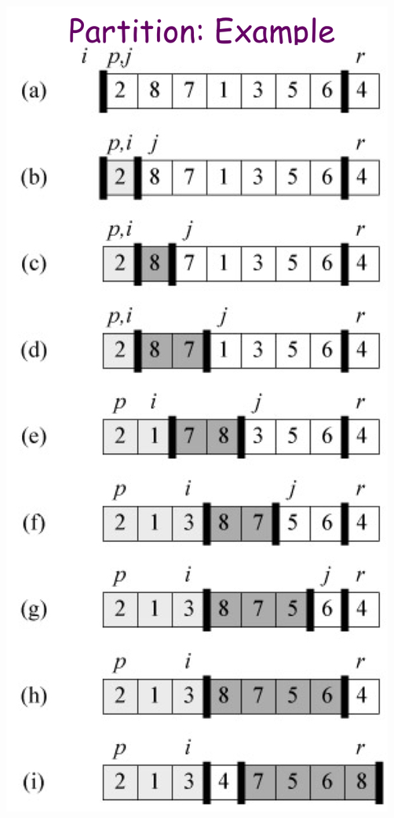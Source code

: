 \documentclass[11pt, a4paper]{COMP3711}
\begin{document}
\begin{spacing}{1.5}
    \begin{center}
        \includegraphics[scale=0.165]{images/03-partition-eg.jpeg}
    \end{center}



\end{spacing}
\end{document}
